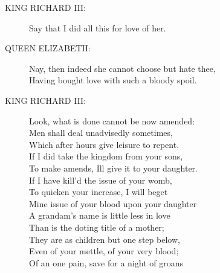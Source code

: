 \documentclass{article}
\begin{document}
\begin{description}
\item[KING RICHARD III:] 
\hspace{1pt}Say that I did all this for love of her.\\
\end{description}
\begin{description}
\item[QUEEN ELIZABETH:] 
\hspace{1pt}Nay, then indeed she cannot choose but hate thee,\\
\hspace{1pt}Having bought love with such a bloody spoil.\\
\end{description}
\begin{description}
\item[KING RICHARD III:] 
\hspace{1pt}Look, what is done cannot be now amended:\\
\hspace{1pt}Men shall deal unadvisedly sometimes,\\
\hspace{1pt}Which after hours give leisure to repent.\\
\hspace{1pt}If I did take the kingdom from your sons,\\
\hspace{1pt}To make amends, Ill give it to your daughter.\\
\hspace{1pt}If I have kill'd the issue of your womb,\\
\hspace{1pt}To quicken your increase, I will beget\\
\hspace{1pt}Mine issue of your blood upon your daughter\\
\hspace{1pt}A grandam's name is little less in love\\
\hspace{1pt}Than is the doting title of a mother;\\
\hspace{1pt}They are as children but one step below,\\
\hspace{1pt}Even of your mettle, of your very blood;\\
\hspace{1pt}Of an one pain, save for a night of groans\\

\end{description}
\end{document}
